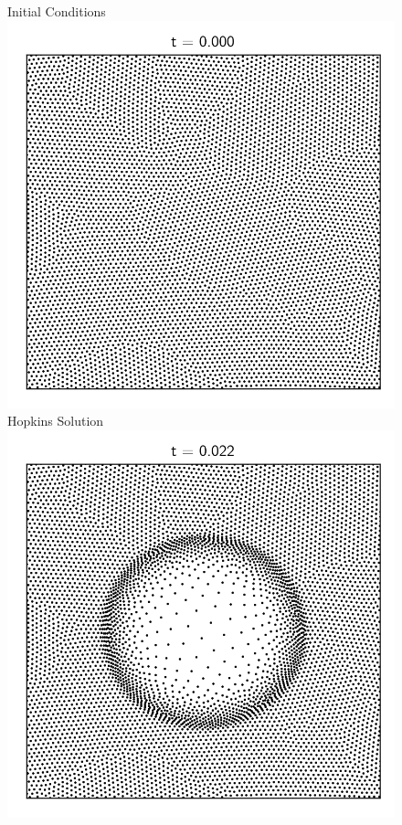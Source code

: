 \begin{figure}
	\centering
	Initial Conditions
  \includegraphics[width=\linewidth]{figures/Meshless/positions_sedov_glass_IC.png}
\endminipage\hfill
{}
	\centering
	Hopkins Solution
  \includegraphics[width=\linewidth]{figures/Meshless/positions_sedov_hopkins_glass.png}

\end{figure}
